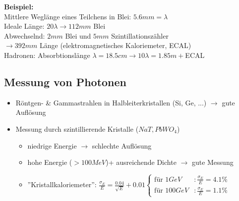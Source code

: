 \documentclass[Ex4_Zusammenfassung.tex]{subfiles}
\begin{document}
\textbf{Beispiel:}\\
Mittlere Weglänge eines Teilchens in Blei: $5.6 \si{mm} = \lambda$\\
Ideale Länge: $20 \lambda \rightarrow 112 \si{mm}$ Blei\\
Abwechselnd: $2 \si{mm}$ Blei und  $5 \si{mm}$ Szintillationszähler\\
$\rightarrow 392 \si{mm}$ Länge (elektromagnetisches Kaloriemeter, ECAL)\\

Hadronen: Absorbtionslänge $\lambda = 18.5 \si{cm} \rightarrow 10 \lambda = 1.85 \si{m}+$ECAL

\subsection{Messung von Photonen}
\begin{itemize}
	\item Röntgen- \& Gammastrahlen in Halbleiterkristallen (Si, Ge, ...) $\rightarrow$ gute Auflösung
	\item Messung durch szintillierende Kristalle ($NaT, PbWO_4$)
		\begin{itemize}
			\item niedrige Energie $\rightarrow$ schlechte Auflösung
			\item hohe Energie ($>100 \si{MeV}$)+ ausreichende Dichte $\rightarrow$ gute Messung
			\item ''Kristallkaloriemeter'': $\frac{\sigma_E}{E} = \frac{0.04}{\sqrt{E}} + 0.01 
				\begin{cases}
					\text{für }1 \si{GeV}&: \frac{\sigma_E}{E}=4.1\% \\
					\text{für }100 \si{GeV} &: \frac{\sigma_E}{E} = 1.1\%
				\end{cases}$
		\end{itemize}
\end{itemize}
\end{document}
